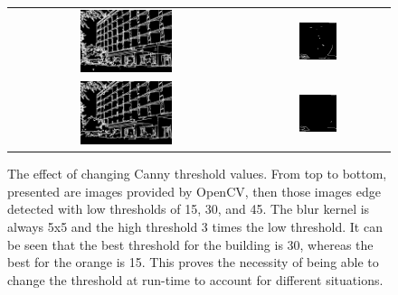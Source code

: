 \begin{figure}[H]
\begin{center}
\begin{tabular}{ c c }
        \includegraphics[width=0.405\textwidth]{Figures/buildThresh30.jpg} &
        \includegraphics[width=0.28\textwidth]{Figures/orangeThresh30.jpg} \\
        \includegraphics[width=0.405\textwidth]{Figures/buildThresh45.jpg} &
        \includegraphics[width=0.28\textwidth]{Figures/orangeThresh45.jpg}
    \end{tabular}
    \caption[The effect of changing Canny threshold values]{The effect of changing Canny threshold values. From top to bottom, presented are images provided by OpenCV, then those images edge detected with low thresholds of 15, 30, and 45. The blur kernel is always 5x5 and the high threshold 3 times the low threshold. It can be seen that the best threshold for the building is 30, whereas the best for the orange is 15. This proves the necessity of being able to change the threshold at run-time to account for different situations.}
    \label{fig:Thresh}
    \end{center}
\end{figure}
